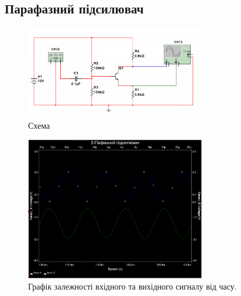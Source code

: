 \documentclass[
  ukrainian,
  14pt
]{extreport}
\begin{document}
\subsection{Парафазний підсилювач}
\begin{figure}[H]
  \includegraphics[width=0.7\textwidth]{imgs/2-1.png}
  \centering
  \caption{Схема}
\end{figure}
\begin{figure}[H]
  \includegraphics[width=0.7\textwidth]{imgs/2-2.png}
  \centering
  \caption{Графік залежності вхідного та вихідного сигналу від часу.
  }
\end{figure}
\end{document}
